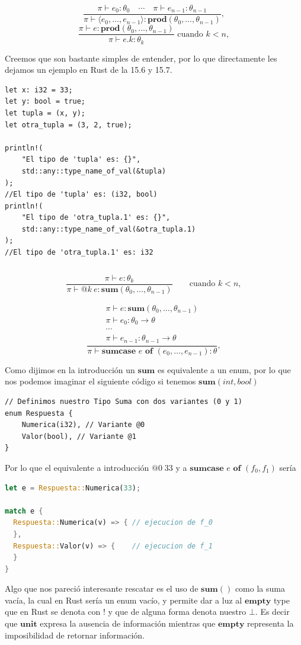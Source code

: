 \documentclass[runningheads]{llncs}
\begin{document}
\[
\frac{\pi \vdash e_0 : \theta_0 \quad \cdots \quad \pi \vdash e_{n-1} : \theta_{n-1}}{\pi \vdash \langle e_0, \ldots, e_{n-1} \rangle : \textbf{prod}(\theta_0, \ldots, \theta_{n-1})},\tag{15.6}
\]
\[
\frac{\pi \vdash e : \textbf{prod}(\theta_0, \dots, \theta_{n-1})}{\pi \vdash e.k : \theta_k}
\text{ cuando } k < n,\tag{15.7}
\]

Creemos que son bastante simples de entender, por lo que directamente les dejamos un ejemplo en Rust de la 15.6 y 15.7.

\begin{lstlisting}
let x: i32 = 33;
let y: bool = true;
let tupla = (x, y);
let otra_tupla = (3, 2, true);

println!(
    "El tipo de 'tupla' es: {}",
    std::any::type_name_of_val(&tupla)
);
//El tipo de 'tupla' es: (i32, bool)
println!(
    "El tipo de 'otra_tupla.1' es: {}",
    std::any::type_name_of_val(&otra_tupla.1)
);
//El tipo de 'otra_tupla.1' es: i32

\end{lstlisting}


$$\;$$

\[
\frac{\pi \vdash e : \theta_k}{\pi \vdash @k \ e : \textbf{sum}(\theta_0, \ldots, \theta_{n-1})}
\qquad \text{cuando } k < n,\tag{15.8}
\]

\[
\frac{
\begin{array}{l}
\pi \vdash e : \textbf{sum}(\theta_0, \ldots, \theta_{n-1}) \\
\pi \vdash e_0 : \theta_0 \to \theta \\
\cdots \\
\pi \vdash e_{n-1} : \theta_{n-1} \to \theta
\end{array}
}{
\pi \vdash \textbf{sumcase } e \textbf{ of } (e_0, \ldots, e_{n-1}) : \theta\tag{15.9}
},
\]

Como dijimos en la introducción un $\textbf{sum}$ es equivalente a un enum, por lo que nos podemos imaginar el siguiente código si tenemos $\textbf{sum}(int, bool)$
\begin{lstlisting}
// Definimos nuestro Tipo Suma con dos variantes (0 y 1)
enum Respuesta {
    Numerica(i32), // Variante @0
    Valor(bool), // Variante @1
}
\end{lstlisting}
Por lo que el equivalente a introducción $@0 \; 33$ y a $\textbf{sumcase } e \textbf{ of } (f_0, f_1)$ sería
\begin{lstlisting}[language=Rust]
let e = Respuesta::Numerica(33);

match e {
  Respuesta::Numerica(v) => { // ejecucion de f_0 
  },
  Respuesta::Valor(v) => {    // ejecucion de f_1
  }
}
\end{lstlisting}
Algo que nos pareció interesante rescatar es el uso de $\textbf{sum}()$ como la suma vacía, la cual en Rust sería un enum vacío, y permite dar a luz al $\textbf{empty}$ type que en Rust se denota con $!$ y que de alguna forma denota nuestro $\bot$.
Es decir que $\textbf{unit}$ expresa la ausencia de información mientras que $\textbf{empty}$ representa la imposibilidad de retornar información. 
\end{document}
